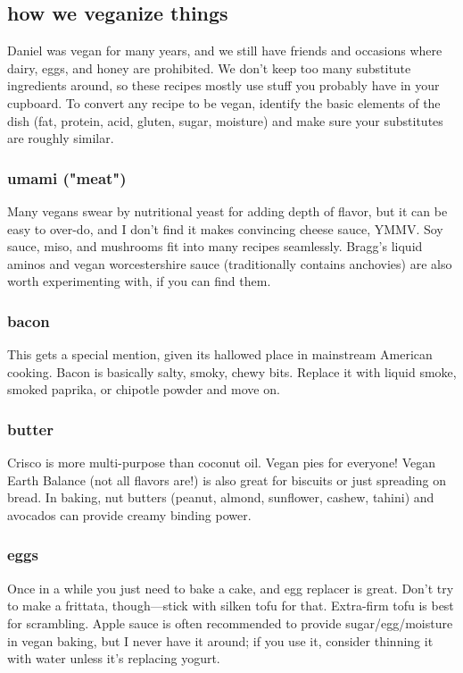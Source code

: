 \subsection{how we veganize things}
Daniel was vegan for many years, and we still have friends and occasions where dairy, eggs, and honey are prohibited. We don't keep too many substitute ingredients around, so these recipes mostly use stuff you probably have in your cupboard. To convert any recipe to be vegan, identify the basic elements of the dish (fat, protein, acid, gluten, sugar, moisture) and make sure your substitutes are roughly similar.

\subsubsection{umami ("meat")}
Many vegans swear by nutritional yeast for adding depth of flavor, but it can be easy to over-do, and I don't find it makes convincing cheese sauce, YMMV. Soy sauce, miso, and mushrooms fit into many recipes seamlessly. Bragg's liquid aminos and vegan worcestershire sauce (traditionally contains anchovies) are also worth experimenting with, if you can find them.

\subsubsection{bacon}
This gets a special mention, given its hallowed place in mainstream American cooking. Bacon is basically salty, smoky, chewy bits. Replace it with liquid smoke, smoked paprika, or chipotle powder and move on.

\subsubsection{butter}
Crisco is more multi-purpose than coconut oil. Vegan pies for everyone! Vegan Earth Balance (not all flavors are!) is also great for biscuits or just spreading on bread. In baking, nut butters (peanut, almond, sunflower, cashew, tahini) and avocados can provide creamy binding power.

\subsubsection{eggs}
Once in a while you just need to bake a cake, and egg replacer is great. Don't try to make a frittata, though---stick with silken tofu for that. Extra-firm tofu is best for scrambling. Apple sauce is often recommended to provide sugar/egg/moisture in vegan baking, but I never have it around; if you use it, consider thinning it with water unless it's replacing yogurt.

